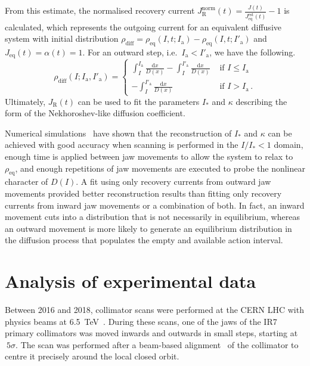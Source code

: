 From this estimate, the normalised recovery current $J_\mathrm{R}^\mathrm{norm}(t) = \frac{J(t)}{J_\mathrm{eq}^\mathrm{est}(t)} - 1$ is calculated, which represents the outgoing current for an equivalent diffusive system with initial distribution $\rho_\text{diff} = \rho_\text{eq}(I, t; I_\mathrm{a}) - \rho_\text{eq}(I, t; I'_\mathrm{a})$ and $J_\text{eq}(t)=\alpha(t)=1$. For an outward step, i.e.\ $I_\mathrm{a} < I'_\mathrm{a}$, we have the following.
\begin{equation}
    \rho_\text{diff}(I; I_\mathrm{a}, I'_\mathrm{a}) = \begin{cases} \int_I^{I_\mathrm{a}}\frac{\mathrm{d}x}{D(x)} -  \int_I^{I'_\mathrm{a}}\frac{\mathrm{d}x}{D(x)} & \text { if } I\leq I_{\mathrm{a}}\\ -  \int_I^{I'_\mathrm{a}}\frac{\mathrm{d}x}{D(x)} & \text { if } I>I_{\mathrm{a}} \, .\end{cases}
    \label{eq:difference}
\end{equation}
Ultimately, $J_\mathrm{R}(t)$ can be used to fit the parameters $I_\ast$ and $\kappa$ describing the form of the Nekhoroshev-like diffusion coefficient.

Numerical simulations~\cite{our_paper9} have shown that the reconstruction of $I_\ast$ and $\kappa$ can be achieved with good accuracy when scanning is performed in the $I/I_\ast < 1$ domain, enough time is applied between jaw movements to allow the system to relax to $\rho_\text{eq}$, and enough repetitions of jaw movements are executed to probe the nonlinear character of $D(I)$. A fit using only recovery currents from outward jaw movements provided better reconstruction results than fitting only recovery currents from inward jaw movements or a combination of both. In fact, an inward movement cuts into a distribution that is not necessarily in equilibrium, whereas an outward movement is more likely to generate an equilibrium distribution in the diffusion process that populates the empty and available action interval.
%
\section{Analysis of experimental data}
%
Between 2016 and 2018, collimator scans were performed at the CERN LHC with physics beams at \SI{6.5}{TeV}~\cite{PhysRevAccelBeams.23.044802}. During these scans, one of the jaws of the IR7 primary collimators was moved inwards and outwards in small steps, starting at $~5\sigma$. The scan was performed after a beam-based alignment~\cite{valentino2012semiautomatic} of the collimator to centre it precisely around the local closed orbit.

